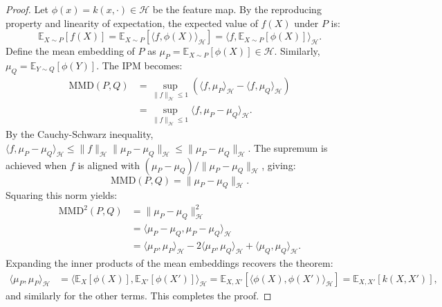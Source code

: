 \begin{proof}
Let $\phi(x) = k(x, \cdot) \in \mathcal{H}$ be the feature map. By the reproducing property and linearity of expectation, the expected value of $f(X)$ under $P$ is:
\begin{equation*}
    \mathbb{E}_{X \sim P}[f(X)] = \mathbb{E}_{X \sim P}[\langle f, \phi(X) \rangle_{\mathcal{H}}] = \langle f, \mathbb{E}_{X \sim P}[\phi(X)] \rangle_{\mathcal{H}}.
\end{equation*}
Define the mean embedding of $P$ as $\mu_P = \mathbb{E}_{X \sim P}[\phi(X)] \in \mathcal{H}$. Similarly, $\mu_Q = \mathbb{E}_{Y \sim Q}[\phi(Y)]$.
The IPM becomes:
\begin{align*}
    \text{MMD}(P, Q) &= \sup_{\| f \|_{\mathcal{H}} \le 1} \left( \langle f, \mu_P \rangle_{\mathcal{H}} - \langle f, \mu_Q \rangle_{\mathcal{H}} \right) \\
    &= \sup_{\| f \|_{\mathcal{H}} \le 1} \langle f, \mu_P - \mu_Q \rangle_{\mathcal{H}}.
\end{align*}
By the Cauchy-Schwarz inequality, $\langle f, \mu_P - \mu_Q \rangle_{\mathcal{H}} \le \|f\|_{\mathcal{H}} \| \mu_P - \mu_Q \|_{\mathcal{H}} \le \| \mu_P - \mu_Q \|_{\mathcal{H}}$. The supremum is achieved when $f$ is aligned with $(\mu_P - \mu_Q) / \| \mu_P - \mu_Q \|_{\mathcal{H}}$, giving:
\begin{equation*}
    \text{MMD}(P, Q) = \| \mu_P - \mu_Q \|_{\mathcal{H}}.
\end{equation*}
Squaring this norm yields:
\begin{align*}
    \text{MMD}^2(P, Q) &= \| \mu_P - \mu_Q \|_{\mathcal{H}}^2 \\
    &= \langle \mu_P - \mu_Q, \mu_P - \mu_Q \rangle_{\mathcal{H}} \\
    &= \langle \mu_P, \mu_P \rangle_{\mathcal{H}} - 2 \langle \mu_P, \mu_Q \rangle_{\mathcal{H}} + \langle \mu_Q, \mu_Q \rangle_{\mathcal{H}}.
\end{align*}
Expanding the inner products of the mean embeddings recovers the theorem:
\begin{align*}
    \langle \mu_P, \mu_P \rangle_{\mathcal{H}} &= \langle \mathbb{E}_{X}[\phi(X)], \mathbb{E}_{X'}[\phi(X')] \rangle_{\mathcal{H}} = \mathbb{E}_{X, X'}[\langle \phi(X), \phi(X') \rangle_{\mathcal{H}}] = \mathbb{E}_{X, X'}[k(X, X')],
\end{align*}
and similarly for the other terms. This completes the proof.
\end{proof}

